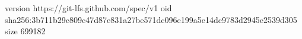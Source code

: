 version https://git-lfs.github.com/spec/v1
oid sha256:3b711b29c809c47d87e831a27be571dc096e199a5e14dc9783d2945e2539d305
size 699182
